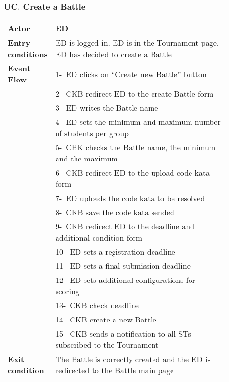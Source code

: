 \subsubsection*{UC\cuc . Create a Battle}
\begin{center}
    \begin{longtable}{|l|p{0.9\linewidth}|}
        \hline
        \textbf{Actor}            & ED                                                                                                                                                                                       \\
        \hline
        \textbf{Entry conditions} & ED is logged in. ED is in the Tournament page. ED has decided to create a Battle        \\
        \hline
        \textbf{Event Flow}       & 1-\ ED clicks on “Create new Battle” button        \\
        & 2-\ CKB redirect ED to the create Battle form        \\
        & 3-\ ED writes the Battle name        \\
        & 4-\ ED sets the minimum and maximum number of students per group        \\
        & 5-\ CBK checks the Battle name, the minimum and the maximum        \\
        & 6-\ CKB redirect ED to the upload code kata form        \\
        & 7-\ ED uploads the code kata to be resolved        \\
        & 8-\ CKB save the code kata sended        \\
        & 9-\ CKB redirect ED to the deadline and additional condition form        \\
        & 10-\ ED sets a registration deadline        \\
        & 11-\ ED sets a final submission deadline        \\
        & 12-\ ED sets additional configurations for scoring        \\
        & 13-\ CKB check deadline         \\
        & 14-\ CKB create a new Battle        \\
        & 15-\ CKB sends a notification to all STs subscribed to the Tournament         \\
        \hline
        \textbf{Exit condition}   & The Battle is correctly created and the ED is redirected to the Battle main page        \\

\end{longtable}
\end{center}
